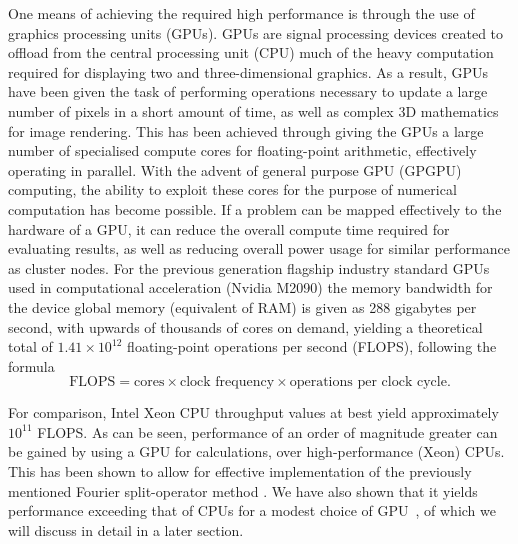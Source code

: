 One means of achieving the required high performance is through the use of graphics processing units (GPUs). GPUs are signal processing devices created to offload from the central processing unit (CPU) much of the heavy computation required for displaying two and three-dimensional graphics. As a result, GPUs have been given the task of performing operations necessary to update a large number of pixels in a short amount of time, as well as complex 3D mathematics for image rendering. This has been achieved through giving the GPUs a large number of specialised compute cores for floating-point arithmetic, effectively operating in parallel. With the advent of general purpose GPU (GPGPU) computing, the ability to exploit these cores for the purpose of numerical computation has become possible. If a problem can be mapped effectively to the hardware of a GPU, it can reduce the overall compute time required for evaluating results, as well as reducing overall power usage for similar performance as cluster nodes. For the previous generation flagship industry standard GPUs used in computational acceleration (Nvidia M2090) the memory bandwidth for the device global memory (equivalent of RAM) is given as 288 gigabytes per second, with upwards of thousands of cores on demand, yielding a theoretical total of $1.41\times10^{12}$ floating-point operations per second (FLOPS), following the formula
\begin{equation}
    \text{FLOPS} = \text{cores}\times\text{clock frequency}\times\text{operations per clock cycle}.
\end{equation}

For comparison, Intel Xeon CPU throughput values at best yield approximately $10^{11}$ FLOPS. As can be seen, performance of an order of magnitude greater can be gained by using a GPU for calculations, over high-performance (Xeon) CPUs. This has been shown to allow for effective implementation of the previously mentioned Fourier split-operator method \cite{Num:Bauke_cpc_2011}. We have also shown that it yields performance exceeding that of CPUs for a modest choice of GPU~\cite{AO:Morgan_pra_2013}, of which we will discuss in detail in a later section.

